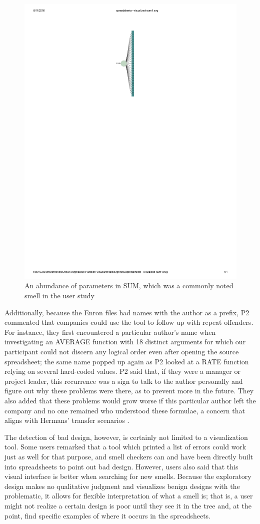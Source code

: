 \documentclass[conference]{IEEEtran}
\begin{document}
	\begin{figure} \centering
		\includegraphics[width=.20\textwidth]{SUM}  \caption{An abundance of parameters
			in SUM, which was a commonly noted smell in the user study} \label{fig:sum}
	\end{figure}
	
	Additionally, because the Enron files had names with the author as a prefix, P2
	commented that companies could use the tool to follow up with repeat offenders.
	For instance, they first encountered a particular author's name when
	investigating an AVERAGE function with 18 distinct arguments for which our
	participant could not discern any logical order even after opening the source
	spreadsheet; the same name popped up again as P2 looked at a RATE function
	relying on several hard-coded values. P2 said that, if they were a manager or
	project leader, this recurrence was a sign to talk to the author personally and
	figure out why these problems were there, as to prevent more in the future.
	They also added that these problems would grow worse if this particular author
	left the company and no one remained who understood these formulae, a concern
	that aligns with Hermans' transfer scenarios \cite{hermans2011supporting}.
	
	The detection of bad design, however, is certainly not limited to a
	visualization tool. Some users remarked that a tool which printed a list of
	errors could work just as well for that purpose, and smell checkers can and
	have been directly built into spreadsheets to point out bad design. However,
	users also said that this visual interface is better when searching for new
	smells. Because the exploratory design makes no qualitative judgment and
	visualizes benign designs with the problematic, it allows for flexible
	interpretation of what a smell is; that is, a user might not realize a certain
	design is poor until they see it in the tree and, at the point, find specific
	examples of where it occurs in the spreadsheets.
	
\end{document}
